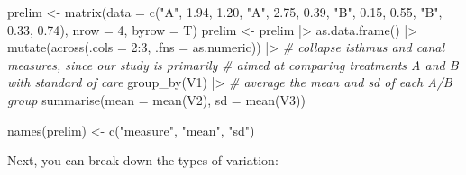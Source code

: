 \documentclass[
]{book}
\newenvironment{Shaded}{\begin{snugshade}}{\end{snugshade}}
\newcommand{\AttributeTok}[1]{\textcolor[rgb]{0.77,0.63,0.00}{#1}}
\newcommand{\CommentTok}[1]{\textcolor[rgb]{0.56,0.35,0.01}{\textit{#1}}}
\newcommand{\DecValTok}[1]{\textcolor[rgb]{0.00,0.00,0.81}{#1}}
\newcommand{\FloatTok}[1]{\textcolor[rgb]{0.00,0.00,0.81}{#1}}
\newcommand{\FunctionTok}[1]{\textcolor[rgb]{0.00,0.00,0.00}{#1}}
\newcommand{\NormalTok}[1]{#1}
\newcommand{\OtherTok}[1]{\textcolor[rgb]{0.56,0.35,0.01}{#1}}
\newcommand{\SpecialCharTok}[1]{\textcolor[rgb]{0.00,0.00,0.00}{#1}}
\newcommand{\StringTok}[1]{\textcolor[rgb]{0.31,0.60,0.02}{#1}}
\begin{document}
\begin{Shaded}
\begin{Highlighting}[]
\NormalTok{prelim }\OtherTok{\textless{}{-}} \FunctionTok{matrix}\NormalTok{(}\AttributeTok{data =} \FunctionTok{c}\NormalTok{(}\StringTok{"A"}\NormalTok{, }\FloatTok{1.94}\NormalTok{, }\FloatTok{1.20}\NormalTok{,}
                             \StringTok{"A"}\NormalTok{, }\FloatTok{2.75}\NormalTok{, }\FloatTok{0.39}\NormalTok{,}
                             \StringTok{"B"}\NormalTok{, }\FloatTok{0.15}\NormalTok{, }\FloatTok{0.55}\NormalTok{,}
                             \StringTok{"B"}\NormalTok{, }\FloatTok{0.33}\NormalTok{, }\FloatTok{0.74}\NormalTok{),}
                    \AttributeTok{nrow =} \DecValTok{4}\NormalTok{,}
                    \AttributeTok{byrow =}\NormalTok{ T)}
\NormalTok{prelim }\OtherTok{\textless{}{-}}\NormalTok{ prelim }\SpecialCharTok{|\textgreater{}} 
  \FunctionTok{as.data.frame}\NormalTok{() }\SpecialCharTok{|\textgreater{}}
  \FunctionTok{mutate}\NormalTok{(}\FunctionTok{across}\NormalTok{(}\AttributeTok{.cols =} \DecValTok{2}\SpecialCharTok{:}\DecValTok{3}\NormalTok{, }\AttributeTok{.fns =}\NormalTok{ as.numeric)) }\SpecialCharTok{|\textgreater{}}
  \CommentTok{\# collapse isthmus and canal measures, since our study is primarily }
  \CommentTok{\# aimed at comparing treatments A and B with standard of care }
  \FunctionTok{group\_by}\NormalTok{(V1) }\SpecialCharTok{|\textgreater{}} 
  \CommentTok{\# average the mean and sd of each A/B group }
  \FunctionTok{summarise}\NormalTok{(}\AttributeTok{mean =} \FunctionTok{mean}\NormalTok{(V2),}
            \AttributeTok{sd =} \FunctionTok{mean}\NormalTok{(V3))}

\FunctionTok{names}\NormalTok{(prelim) }\OtherTok{\textless{}{-}} \FunctionTok{c}\NormalTok{(}\StringTok{"measure"}\NormalTok{, }\StringTok{"mean"}\NormalTok{, }\StringTok{"sd"}\NormalTok{)}
\end{Highlighting}
\end{Shaded}

Next, you can break down the types of variation:

\begin{Shaded}
\end{Shaded}
\end{document}
